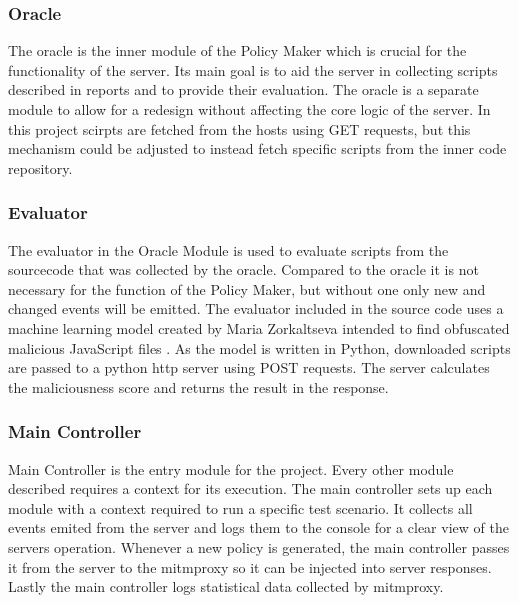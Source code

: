 \begin{description}
\subsubsection{Oracle}
The oracle is the inner module of the Policy Maker which is crucial for the functionality of the server.
Its main goal is to aid the server in collecting scripts described in reports and to provide their evaluation.
The oracle is a separate module to allow for a redesign without affecting the core logic of the server.
In this project scirpts are fetched from the hosts using GET requests, but this mechanism could be adjusted to instead fetch specific scripts from the inner code repository.

\subsubsection{Evaluator}
The evaluator in the Oracle Module is used to evaluate scripts from the sourcecode that was collected by the oracle.
Compared to the oracle it is not necessary for the function of the Policy Maker, but without one only new and changed events will be emitted.
The evaluator included in the source code uses a machine learning model created by Maria Zorkaltseva intended to find obfuscated malicious JavaScript files \cite{evaluator}.
As the model is written in Python, downloaded scripts are passed to a python http server using POST requests.
The server calculates the maliciousness score and returns the result in the response.

\subsubsection{Main Controller}
Main Controller is the entry module for the project.
Every other module described requires a context for its execution.
The main controller sets up each module with a context required to run a specific test scenario.
It collects all events emited from the server and logs them to the console for a clear view of the servers operation.
Whenever a new policy is generated, the main controller passes it from the server to the mitmproxy so it can be injected into server responses.
Lastly the main controller logs statistical data collected by mitmproxy.


\end{description}
